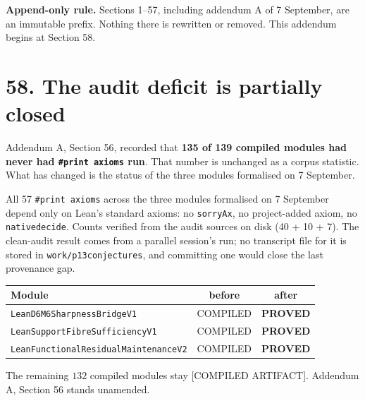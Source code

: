 \documentclass[9pt,twocolumn]{article}
\newcommand{\eclass}[1]{\textsf{[#1]}}
\renewcommand{\_}{\CIGunderscore\allowbreak}
\begin{document}
\sloppy
{}

\textbf{Append-only rule.} Sections 1--57, including addendum A of 7 September, are an immutable prefix. Nothing there is rewritten or removed. This addendum begins at Section 58.

\section*{58. The audit deficit is partially closed}
Addendum A, Section 56, recorded that \textbf{135 of 139 compiled modules had never had \texttt{\#print axioms} run}. That number is unchanged as a corpus statistic. What has changed is the status of the three modules formalised on 7 September.

All 57 \texttt{\#print axioms} across the three modules formalised on 7 September depend only on Lean's standard axioms: no \texttt{sorryAx}, no project-added axiom, no \texttt{native\_decide}. Counts verified from the audit sources on disk (40 + 10 + 7). The clean-audit result comes from a parallel session's run; no transcript file for it is stored in \texttt{work/p13\_conjectures}, and committing one would close the last provenance gap.

\begin{center}\scriptsize
\begin{tabularx}{0.98\columnwidth}{X c c}
\toprule
Module & before & after\\
\midrule
\texttt{Lean\allowbreak D6M6\allowbreak Sharpness\allowbreak BridgeV1} & COMPILED & \textbf{PROVED}\\
\texttt{Lean\allowbreak Support\allowbreak Fibre\allowbreak SufficiencyV1} & COMPILED & \textbf{PROVED}\\
\texttt{Lean\allowbreak Functional\allowbreak Residual\allowbreak MaintenanceV2} & COMPILED & \textbf{PROVED}\\
\bottomrule
\end{tabularx}
\end{center}
The remaining $132$ compiled modules stay \eclass{COMPILED ARTIFACT}. Addendum A, Section 56 stands unamended.
\end{document}
